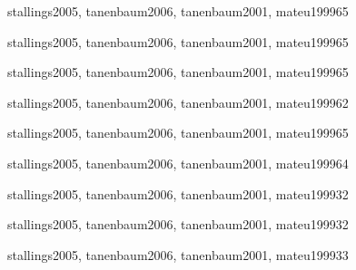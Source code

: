 \begin{syllabus}
\begin{unit}{\OSSchedulingAndDispatchDef}{}{stallings2005, tanenbaum2006, tanenbaum2001, mateu1999}{6}{5}
    \OSSchedulingAndDispatchAllTopics
    \OSSchedulingAndDispatchAllObjectives
\end{unit}

\begin{unit}{\OSMemoryManagementDef}{}{stallings2005, tanenbaum2006, tanenbaum2001, mateu1999}{6}{5}
    \OSMemoryManagementAllTopics
    \OSMemoryManagementAllObjectives
\end{unit}

\begin{unit}{\OSDeviceManagementDef}{}{stallings2005, tanenbaum2006, tanenbaum2001, mateu1999}{6}{5}
    \OSDeviceManagementAllTopics
    \OSDeviceManagementAllObjectives
\end{unit}

\begin{unit}{\OSSecurityAndProtectionDef}{}{stallings2005, tanenbaum2006, tanenbaum2001, mateu1999}{6}{2}
    \OSSecurityAndProtectionAllTopics
    \OSSecurityAndProtectionAllObjectives
\end{unit}

\begin{unit}{\OSFileSystemsDef}{}{stallings2005, tanenbaum2006, tanenbaum2001, mateu1999}{6}{5}
    \OSFileSystemsAllTopics
    \OSFileSystemsAllObjectives
\end{unit}

\begin{unit}{\OSRealTimeAndEmbeddedSystemsDef}{}{stallings2005, tanenbaum2006, tanenbaum2001, mateu1999}{6}{4}
    \OSRealTimeAndEmbeddedSystemsAllTopics
    \OSRealTimeAndEmbeddedSystemsAllObjectives
\end{unit}

\begin{unit}{\OSFaultToleranceDef}{}{stallings2005, tanenbaum2006, tanenbaum2001, mateu1999}{3}{2}
    \OSFaultToleranceAllTopics
    \OSFaultToleranceAllObjectives
\end{unit}

\begin{unit}{\OSSystemPerformanceEvaluationDef}{}{stallings2005, tanenbaum2006, tanenbaum2001, mateu1999}{3}{2}
      \OSSystemPerformanceEvaluationAllTopics
      \OSSystemPerformanceEvaluationAllObjectives
  \end{unit}

\begin{unit}{\OSScriptingDef}{}{stallings2005, tanenbaum2006, tanenbaum2001, mateu1999}{3}{3}
      \OSScriptingAllTopics
      \OSScriptingAllObjectives
\end{unit}

\begin{coursebibliography}
\end{coursebibliography}

\end{syllabus}
